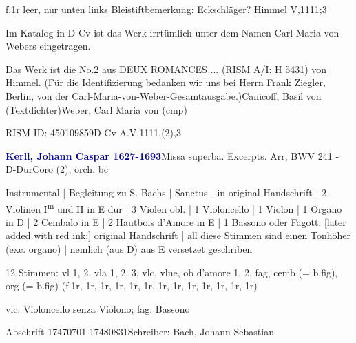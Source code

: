 \documentclass[a4paper, twocolumn, 11pt]{book}
\begin{document}
\newline %
\par f.1r leer, nur unten links Bleistiftbemerkung: {\textquotedbl}Eckschläger? Himmel V,1111;3{\textquotedbl}
\par Im Katalog in D-Cv ist das Werk irrtümlich unter dem Namen Carl Maria von Webers eingetragen.
\par Das Werk ist die No.2 aus {\textquotedbl}DEUX ROMANCES ...{\textquotedbl}  (RISM A/I: H 5431) von Himmel. (Für die Identifizierung bedanken wir uns bei Herrn Frank Ziegler, Berlin, von der Carl-Maria-von-Weber-Gesamtausgabe.)\newline Canicoff, Basil von  (Textdichter)\newline Weber, Carl Maria von  (cmp)
\par RISM-ID: 450109859\newline D-Cv  A.V,1111,(2),3
\par \vspace{16pt} \textcolor{darkblue}{\textbf{Kerll, Johann Caspar  1627-1693}}\hfillplus{[40]}\newline Missa superba. Excerpts. Arr, BWV 241 - D-Dur\newline Coro (2), orch, bc
\par \begin{itshape} Instrumental | Begleitung zu S. Bachs | Sanctus - in original Handschrift | 2 Violinen I\textsuperscript{m} und II in E dur | 3 Violen obl. | 1 Violoncello | 1 Violon | 1 Organo in D | 2 Cembalo in E | 2 Hautbois d'Amore in E | 1 Bassono oder Fagott. [later added with red ink:]  original Handschrift | all diese Stimmen sind einen Tonhöher (exc. organo) | nemlich (aus D) aus E versetzet geschriben\end{itshape} 
\par \textcolor{darkblue}{}  12 Stimmen: vl 1, 2, vla 1, 2, 3, vlc, vlne, ob d'amore 1, 2, fag, cemb (= b.fig), org (= b.fig)  (f.1r, 1r, 1r, 1r, 1r, 1r, 1r, 1r, 1r, 1r, 1r, 1r, 1r)\newline \begin{small} vlc: {\textquotedbl}Violoncello senza Violono{\textquotedbl}; fag: {\textquotedbl}Bassono{\textquotedbl}\end{small} \newline Abschrift  17470701-17480831\newline Schreiber: Bach, Johann Sebastian
\end{document}
